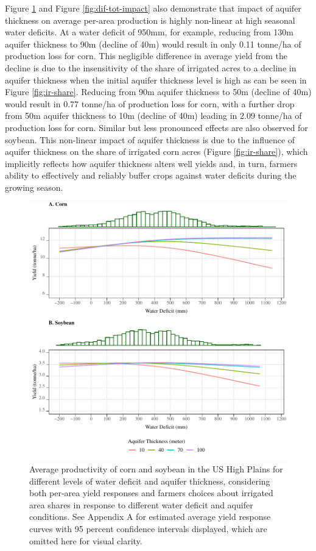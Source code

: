 \documentclass[
]{article}
\begin{document}
Figure \ref{fig:tot-impact} and Figure \ref{fig:dif-tot-impact} also demonstrate that impact of aquifer thickness on average per-area production is highly non-linear at high seasonal water deficits. At a water deficit of 950mm, for example, reducing from 130m aquifer thickness to 90m (decline of 40m) would result in only 0.11 tonne/ha of production loss for corn. This negligible difference in average yield from the decline is due to the insensitivity of the share of irrigated acres to a decline in aquifer thickness when the initial aquifer thickness level is high as can be seen in Figure \ref{fig:ir-share}. Reducing from 90m aquifer thickness to 50m (decline of 40m) would result in 0.77 tonne/ha of production loss for corn, with a further drop from 50m aquifer thickness to 10m (decline of 40m) leading in 2.09 tonne/ha of production loss for corn. Similar but less pronounced effects are also observed for soybean. This non-linear impact of aquifer thickness is due to the influence of aquifer thickness on the share of irrigated corn acres (Figure \ref{fig:ir-share}), which implicitly reflects how aquifer thickness alters well yields and, in turn, farmers ability to effectively and reliably buffer crops against water deficits during the growing season.

\begin{figure}[H]

{\centering \includegraphics[width=6in,]{Figures/g_total_impact} 

}

\caption{Average productivity of corn and soybean in the US High Plains for different levels of water deficit and aquifer thickness, considering both per-area yield responses and farmers choices about irrigated area shares in response to different water deficit and aquifer conditions. See Appendix A for estimated average yield response curves with 95 percent confidence intervals displayed, which are omitted here for visual clarity.}\label{fig:tot-impact}
\end{figure}
\end{document}
